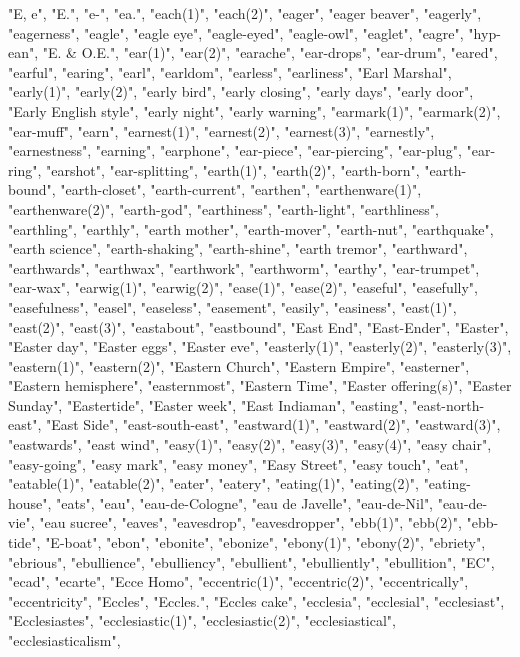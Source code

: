 "E, e",
"E.",
"e-",
"ea.",
"each(1)",
"each(2)",
"eager",
"eager beaver",
"eagerly",
"eagerness",
"eagle",
"eagle eye",
"eagle-eyed",
"eagle-owl",
"eaglet",
"eagre",
"hyp-ean",
"E. \& O.E.",
"ear(1)",
"ear(2)",
"earache",
"ear-drops",
"ear-drum",
"eared",
"earful",
"earing",
"earl",
"earldom",
"earless",
"earliness",
"Earl Marshal",
"early(1)",
"early(2)",
"early bird",
"early closing",
"early days",
"early door",
"Early English style",
"early night",
"early warning",
"earmark(1)",
"earmark(2)",
"ear-muff",
"earn",
"earnest(1)",
"earnest(2)",
"earnest(3)",
"earnestly",
"earnestness",
"earning",
"earphone",
"ear-piece",
"ear-piercing",
"ear-plug",
"ear-ring",
"earshot",
"ear-splitting",
"earth(1)",
"earth(2)",
"earth-born",
"earth-bound",
"earth-closet",
"earth-current",
"earthen",
"earthenware(1)",
"earthenware(2)",
"earth-god",
"earthiness",
"earth-light",
"earthliness",
"earthling",
"earthly",
"earth mother",
"earth-mover",
"earth-nut",
"earthquake",
"earth science",
"earth-shaking",
"earth-shine",
"earth tremor",
"earthward",
"earthwards",
"earthwax",
"earthwork",
"earthworm",
"earthy",
"ear-trumpet",
"ear-wax",
"earwig(1)",
"earwig(2)",
"ease(1)",
"ease(2)",
"easeful",
"easefully",
"easefulness",
"easel",
"easeless",
"easement",
"easily",
"easiness",
"east(1)",
"east(2)",
"east(3)",
"eastabout",
"eastbound",
"East End",
"East-Ender",
"Easter",
"Easter day",
"Easter eggs",
"Easter eve",
"easterly(1)",
"easterly(2)",
"easterly(3)",
"eastern(1)",
"eastern(2)",
"Eastern Church",
"Eastern Empire",
"easterner",
"Eastern hemisphere",
"easternmost",
"Eastern Time",
"Easter offering(s)",
"Easter Sunday",
"Eastertide",
"Easter week",
"East Indiaman",
"easting",
"east-north-east",
"East Side",
"east-south-east",
"eastward(1)",
"eastward(2)",
"eastward(3)",
"eastwards",
"east wind",
"easy(1)",
"easy(2)",
"easy(3)",
"easy(4)",
"easy chair",
"easy-going",
"easy mark",
"easy money",
"Easy Street",
"easy touch",
"eat",
"eatable(1)",
"eatable(2)",
"eater",
"eatery",
"eating(1)",
"eating(2)",
"eating-house",
"eats",
"eau",
"eau-de-Cologne",
"eau de Javelle",
"eau-de-Nil",
"eau-de-vie",
"eau sucree",
"eaves",
"eavesdrop",
"eavesdropper",
"ebb(1)",
"ebb(2)",
"ebb-tide",
"E-boat",
"ebon",
"ebonite",
"ebonize",
"ebony(1)",
"ebony(2)",
"ebriety",
"ebrious",
"ebullience",
"ebulliency",
"ebullient",
"ebulliently",
"ebullition",
"EC",
"ecad",
"ecarte",
"Ecce Homo",
"eccentric(1)",
"eccentric(2)",
"eccentrically",
"eccentricity",
"Eccles",
"Eccles.",
"Eccles cake",
"ecclesia",
"ecclesial",
"ecclesiast",
"Ecclesiastes",
"ecclesiastic(1)",
"ecclesiastic(2)",
"ecclesiastical",
"ecclesiasticalism",

